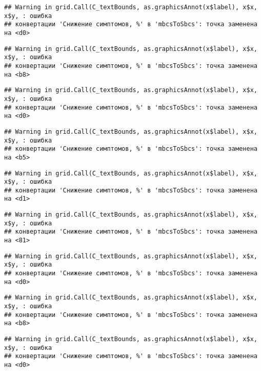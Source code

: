 \documentclass[
]{article}
\begin{document}
\begin{verbatim}
## Warning in grid.Call(C_textBounds, as.graphicsAnnot(x$label), x$x, x$y, : ошибка
## конвертации 'Снижение симптомов, %' в 'mbcsToSbcs': точка заменена на <d0>
\end{verbatim}

\begin{verbatim}
## Warning in grid.Call(C_textBounds, as.graphicsAnnot(x$label), x$x, x$y, : ошибка
## конвертации 'Снижение симптомов, %' в 'mbcsToSbcs': точка заменена на <b8>
\end{verbatim}

\begin{verbatim}
## Warning in grid.Call(C_textBounds, as.graphicsAnnot(x$label), x$x, x$y, : ошибка
## конвертации 'Снижение симптомов, %' в 'mbcsToSbcs': точка заменена на <d0>
\end{verbatim}

\begin{verbatim}
## Warning in grid.Call(C_textBounds, as.graphicsAnnot(x$label), x$x, x$y, : ошибка
## конвертации 'Снижение симптомов, %' в 'mbcsToSbcs': точка заменена на <b5>
\end{verbatim}

\begin{verbatim}
## Warning in grid.Call(C_textBounds, as.graphicsAnnot(x$label), x$x, x$y, : ошибка
## конвертации 'Снижение симптомов, %' в 'mbcsToSbcs': точка заменена на <d1>
\end{verbatim}

\begin{verbatim}
## Warning in grid.Call(C_textBounds, as.graphicsAnnot(x$label), x$x, x$y, : ошибка
## конвертации 'Снижение симптомов, %' в 'mbcsToSbcs': точка заменена на <81>
\end{verbatim}

\begin{verbatim}
## Warning in grid.Call(C_textBounds, as.graphicsAnnot(x$label), x$x, x$y, : ошибка
## конвертации 'Снижение симптомов, %' в 'mbcsToSbcs': точка заменена на <d0>
\end{verbatim}

\begin{verbatim}
## Warning in grid.Call(C_textBounds, as.graphicsAnnot(x$label), x$x, x$y, : ошибка
## конвертации 'Снижение симптомов, %' в 'mbcsToSbcs': точка заменена на <b8>
\end{verbatim}

\begin{verbatim}
## Warning in grid.Call(C_textBounds, as.graphicsAnnot(x$label), x$x, x$y, : ошибка
## конвертации 'Снижение симптомов, %' в 'mbcsToSbcs': точка заменена на <d0>
\end{verbatim}
\end{document}
